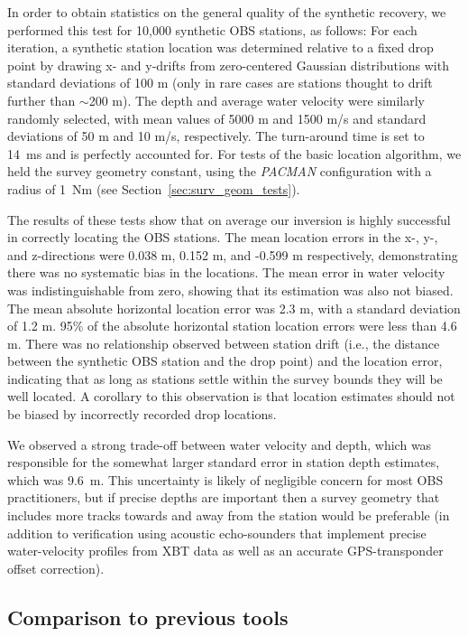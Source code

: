 In order to obtain statistics on the general quality of the synthetic recovery, we performed this test for 10,000 synthetic OBS stations, as follows: For each iteration, a synthetic station location was determined relative to a fixed drop point by drawing x- and y-drifts from zero-centered Gaussian distributions with standard deviations of 100 m (only in rare cases are stations thought to drift further than $\sim$200 m). The depth and average water velocity were similarly randomly selected, with mean values of 5000 m and 1500 m/s and standard deviations of 50 m and 10 m/s, respectively. The turn-around time is set to 14~ms and is perfectly accounted for. For tests of the basic location algorithm, we held the survey geometry constant, using the \textit{PACMAN} configuration with a radius of 1~Nm (see Section~\ref{sec:surv_geom_tests}). 
  
The results of these tests show that on average our inversion is highly successful in correctly locating the OBS stations. The mean location errors in the x-, y-, and z-directions were 0.038 m, 0.152 m, and -0.599 m respectively, demonstrating there was no systematic bias in the locations. The mean error in water velocity was indistinguishable from zero, showing that its estimation was also not biased. The mean absolute horizontal location error was 2.3 m, with a standard deviation of 1.2 m. 95\% of the absolute horizontal station location errors were less than 4.6 m. There was no relationship observed between station drift (i.e., the distance between the synthetic OBS station and the drop point) and the location error, indicating that as long as stations settle within the survey bounds they will be well located. A corollary to this observation is that location estimates should not be biased by incorrectly recorded drop locations. 

We observed a strong trade-off between water velocity and depth, which was responsible for the somewhat larger standard error in station depth estimates, which was \mbox{9.6~m}. This uncertainty is likely of negligible concern for most OBS practitioners, but if precise depths are important then a survey geometry that includes more tracks towards and away from the station would be preferable (in addition to verification using acoustic echo-sounders that implement precise water-velocity profiles from XBT data as well as an accurate GPS-transponder offset correction).

\subsection{Comparison to previous tools}

